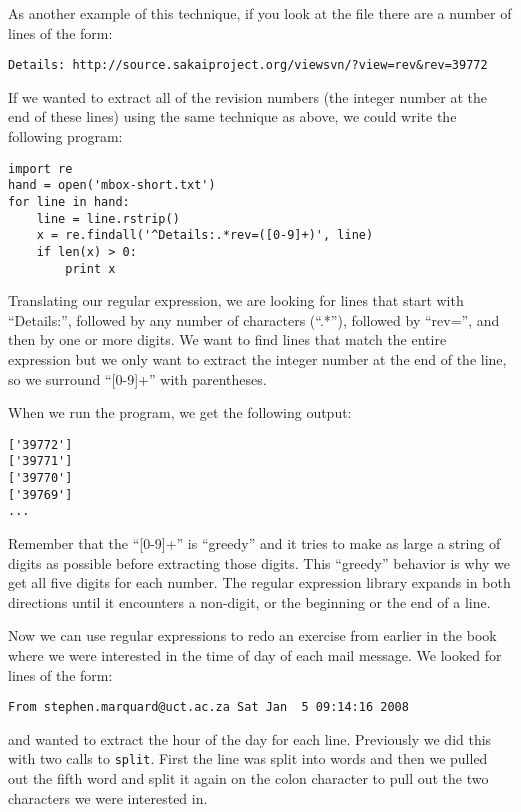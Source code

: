 As another example of this technique, if you look at the file there are a number of lines
of the form:

\beforeverb
\begin{verbatim}
Details: http://source.sakaiproject.org/viewsvn/?view=rev&rev=39772
\end{verbatim}
\afterverb
%
If we wanted to extract all of the revision numbers (the integer number at the end of these lines)
using the same technique as above, we could write the following program:

\beforeverb
\begin{verbatim}
import re
hand = open('mbox-short.txt')
for line in hand:
    line = line.rstrip()
    x = re.findall('^Details:.*rev=([0-9]+)', line)
    if len(x) > 0:
        print x
\end{verbatim}
\afterverb
%
Translating our regular expression, we are looking for lines that start with ``Details:'',
followed by any number of characters (``.*''), followed by ``rev='', and then by one or
more digits.   We want to find lines that match the entire expression but we only want to
extract the integer number at the end of the line, so we surround ``[0-9]+'' with parentheses.  

When we run the program, we get the following output:

\beforeverb
\begin{verbatim}
['39772']
['39771']
['39770']
['39769']
...
\end{verbatim}
\afterverb
%
Remember that the ``[0-9]+'' is ``greedy'' and it tries to make as large a string of digits as
possible before extracting those digits.  This ``greedy'' behavior is why we get all five digits
for each number.  The regular expression library expands in both directions until it encounters a
non-digit, or the beginning or the end of a line.

Now we can use regular expressions to redo an exercise from earlier in the book where we were
interested in the time of day of each mail message.   We looked for lines of the form:

\beforeverb
\begin{verbatim}
From stephen.marquard@uct.ac.za Sat Jan  5 09:14:16 2008
\end{verbatim}
\afterverb
%
and wanted to extract the hour of the day for each line.  Previously we did this with two calls
to {\tt split}.  First the line was split into words and then we pulled out the fifth word and split
it again on the colon character to pull out the two characters we were interested in.

